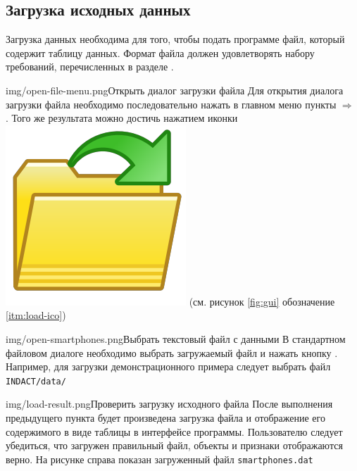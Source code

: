 \documentclass[12pt,tikz]{instruction}
\begin{document}
\newpage
\subsection{Загрузка исходных данных}
\label{subsec:dataload}

Загрузка данных необходима для того, чтобы подать программе файл, который содержит таблицу данных. Формат файла должен удовлетворять набору требований, перечисленных в разделе . 

\begin{steps}
	\begin{ist}{img/open-file-menu.png}{Открыть диалог загрузки файла}
		Для открытия диалога загрузки файла необходимо последовательно нажать в главном меню пункты  $ \Rightarrow $ . Того же результата можно достичь нажатием иконки \includegraphics[scale=0.05]{img/folder-ico.png} (см. рисунок \ref{fig:gui} обозначение \ref{itm:load-ico})
	\end{ist}
	
	\begin{ist}{img/open-smartphones.png}{Выбрать текстовый файл с данными}
		В стандартном файловом диалоге необходимо выбрать загружаемый файл и нажать кнопку . Например, для загрузки демонстрационного примера следует выбрать файл \texttt{INDACT/data/} \SampleFile 
	\end{ist}
	\begin{ist}{img/load-result.png}{Проверить загрузку исходного файла}
		После выполнения предыдущего пункта будет произведена загрузка файла и отображение его содержимого в виде таблицы в интерфейсе программы. Пользователю следует убедиться, что загружен правильный файл, объекты и признаки отображаются верно. На рисунке справа показан загруженный файл \texttt{smartphones.dat} 
	\end{ist}
\end{steps}
\end{document}
